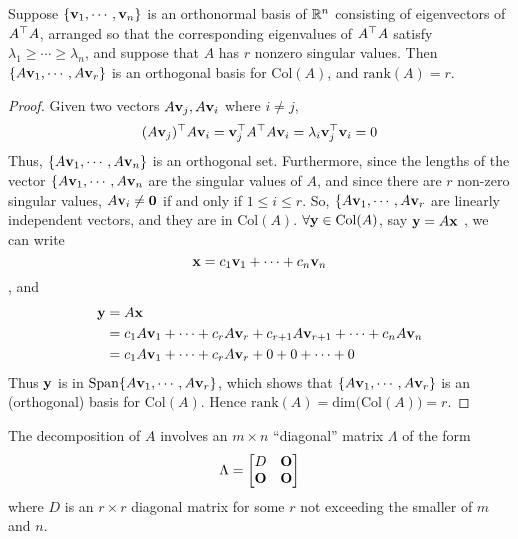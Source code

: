     \begin{Thm}\label{t-1}
        Suppose $\{\mathbf{v}_1, \cdots, \mathbf{v}_n\}$ is an orthonormal basis of $\mathbb{R}^n$ consisting of eigenvectors of $A^{\top}A$, arranged so that the corresponding eigenvalues of $A^{\top}A$ satisfy $\lambda_1\geq \cdots\geq \lambda_n$, and suppose that $A$ has $r$ nonzero singular values. Then $\{A\mathbf{v}_1, \cdots, A\mathbf{v}_r \}$ is an orthogonal basis for $\text{Col}(A)$, and $\text{rank}(A) = r$.
        \begin{proof}
            Given two vectors $A\mathbf{v}_j, A\mathbf{v}_i$ where $i\neq j$, 
            \begin{equation*}
                (A\mathbf{v}_j)^{\top}A\mathbf{v}_i = \mathbf{v}_j^{\top}A^{\top}A\mathbf{v}_i = \lambda_i \mathbf{v}_j^{\top}\mathbf{v}_i = 0 
            \end{equation*} Thus, $\{A\mathbf{v}_1, \cdots, A\mathbf{v}_n \}$ is an orthogonal set. Furthermore, since the lengths of the vector $\{A\mathbf{v}_1, \cdots, A\mathbf{v}_n$ are the singular values of $A$, and since there are $r$ non-zero singular values, $A\mathbf{v}_i\neq \mathbf{0}$ if and only if $1\leq i\leq r$. So, $\{A\mathbf{v}_1, \cdots, A\mathbf{v}_r$ are linearly independent vectors, and they are in $\text{Col}(A)$. $\forall \mathbf{y}\in\text{Col}(A)$, say $\mathbf{y} = A\mathbf{x}$ , we can write
            \begin{equation*}
                \mathbf{x} = c_1\mathbf{v}_1 + \cdots + c_n\mathbf{v}_n
            \end{equation*}, and 
            \begin{align*}
                \mathbf{y} &= A\mathbf{x}\\
                & = c_1A\mathbf{v}_1 + \cdots + c_rA\mathbf{v}_r + c_{r+1}A\mathbf{v}_{r+1} + \cdots + c_nA\mathbf{v}_n\\
                & = c_1A\mathbf{v}_1 + \cdots + c_rA\mathbf{v}_r + 0 + 0 + \cdots + 0
            \end{align*} Thus $\mathbf{y}$ is in $\text{Span}\{A\mathbf{v}_1, \cdots, A\mathbf{v}_r \}$, which shows that $\{ A\mathbf{v}_1, \cdots, A\mathbf{v}_r \}$ is an (orthogonal) basis for $\text{Col}(A)$. Hence $\text{rank}(A) = \text{dim}\Big(\text{Col}(A)\Big) = r$.
        \end{proof}
    \end{Thm}
The decomposition of $A$ involves an $m\times n$ \enquote{diagonal} matrix $\Lambda$ of the form
\begin{equation}\label{Lambda}
    \Lambda = \begin{bmatrix}
        D & \mathbf{O}\\
        \mathbf{O} & \mathbf{O}
    \end{bmatrix}
\end{equation} where $D$ is an $r\times r$ diagonal matrix for some $r$ not exceeding the smaller of $m$ and $n$.

